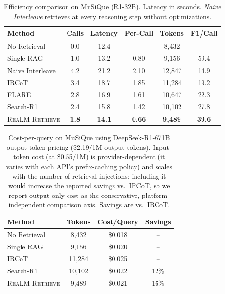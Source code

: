 \documentclass[sigconf,natbib=true]{acmart}
\newcommand{\methodname}{\textsc{ReaLM-Retrieve}}
\begin{document}
\begin{table}[t]
\small
\centering
\caption{Efficiency comparison on MuSiQue (R1-32B). Latency in seconds. \emph{Naive Interleave} retrieves at every reasoning step without optimizations.}
\label{tab:efficiency}
\begin{tabular}{@{}l|ccccc@{}}
\toprule
\textbf{Method} & \textbf{Calls} & \textbf{Latency} & \textbf{Per-Call} & \textbf{Tokens} & \textbf{F1/Call} \\
\midrule
No Retrieval & 0.0 & 12.4 & -- & 8,432 & -- \\
Single RAG & 1.0 & 13.2 & 0.80 & 9,156 & 59.4 \\
Naive Interleave & 4.2 & 21.2 & 2.10 & 12,847 & 14.9 \\
IRCoT & 3.4 & 18.7 & 1.85 & 11,284 & 19.2 \\
FLARE & 2.8 & 16.9 & 1.61 & 10,647 & 22.3 \\
Search-R1 & 2.4 & 15.8 & 1.42 & 10,102 & 27.8 \\
\methodname{} & \textbf{1.8} & \textbf{14.1} & \textbf{0.66} & \textbf{9,489} & \textbf{39.6} \\
\bottomrule
\end{tabular}
\end{table}

\begin{table}[t]
\small
\centering
\caption{Cost-per-query on MuSiQue using DeepSeek-R1-671B output-token pricing (\$2.19/1M output tokens). Input-token cost (at \$0.55/1M) is provider-dependent (it varies with each API's prefix-caching policy) and scales with the number of retrieval injections; including it would increase the reported savings vs.\ IRCoT, so we report output-only cost as the conservative, platform-independent comparison axis. Savings are vs.\ IRCoT.}
\label{tab:cost}
\begin{tabular}{@{}l|ccc@{}}
\toprule
\textbf{Method} & \textbf{Tokens} & \textbf{Cost/Query} & \textbf{Savings} \\
\midrule
No Retrieval & 8,432 & \$0.018 & -- \\
Single RAG & 9,156 & \$0.020 & -- \\
IRCoT & 11,284 & \$0.025 & -- \\
Search-R1 & 10,102 & \$0.022 & 12\% \\
\methodname{} & 9,489 & \$0.021 & 16\% \\
\bottomrule
\end{tabular}
\end{table}
\end{document}
